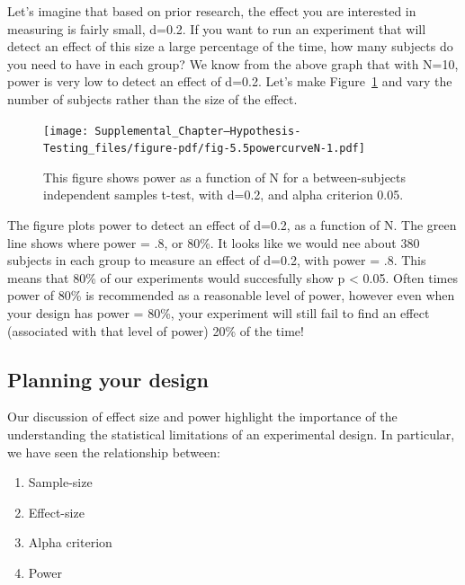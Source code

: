 \documentclass[
  letterpaper,
  DIV=11,
  numbers=noendperiod]{scrartcl}
\providecommand{\tightlist}{%
  \setlength{\itemsep}{0pt}\setlength{\parskip}{0pt}}\usepackage{longtable,booktabs,array}
\begin{document}
Let's imagine that based on prior research, the effect you are
interested in measuring is fairly small, d=0.2. If you want to run an
experiment that will detect an effect of this size a large percentage of
the time, how many subjects do you need to have in each group? We know
from the above graph that with N=10, power is very low to detect an
effect of d=0.2. Let's make Figure~\ref{fig-5.5powercurveN} and vary the
number of subjects rather than the size of the effect.

\begin{figure}

{\centering \texttt{[image: Supplemental\_Chapter---Hypothesis-Testing\_files/figure-pdf/fig-5.5powercurveN-1.pdf]}

}

\caption{\label{fig-5.5powercurveN}This figure shows power as a function
of N for a between-subjects independent samples t-test, with d=0.2, and
alpha criterion 0.05.}

\end{figure}

The figure plots power to detect an effect of d=0.2, as a function of N.
The green line shows where power = .8, or 80\%. It looks like we would
nee about 380 subjects in each group to measure an effect of d=0.2, with
power = .8. This means that 80\% of our experiments would succesfully
show p \textless{} 0.05. Often times power of 80\% is recommended as a
reasonable level of power, however even when your design has power =
80\%, your experiment will still fail to find an effect (associated with
that level of power) 20\% of the time!

\hypertarget{planning-your-design}{%
\subsection{Planning your design}\label{planning-your-design}}

Our discussion of effect size and power highlight the importance of the
understanding the statistical limitations of an experimental design. In
particular, we have seen the relationship between:

\begin{enumerate}
\def\labelenumi{\arabic{enumi}.}
\tightlist
\item
  Sample-size
\item
  Effect-size
\item
  Alpha criterion
\item
  Power
\end{enumerate}
\end{document}
